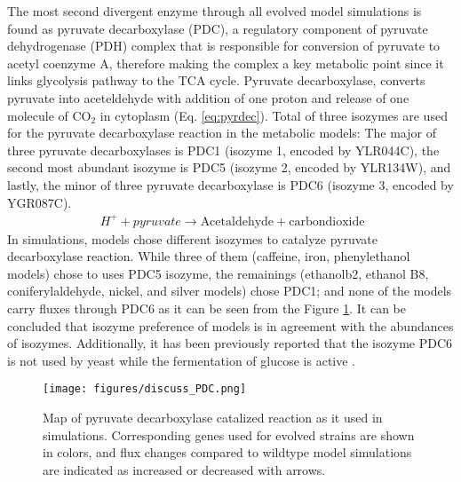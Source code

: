 The most second divergent enzyme through all evolved model simulations is found as pyruvate decarboxylase (PDC), a regulatory component of pyruvate dehydrogenase (PDH) complex that is responsible for conversion of pyruvate to acetyl coenzyme A, therefore making the complex a key metabolic point since it links glycolysis pathway to the TCA cycle. Pyruvate decarboxylase, converts pyruvate into aceteldehyde with addition of one proton and release of one molecule of CO$_2$ in cytoplasm (Eq. \ref{eq:pyrdec}). Total of three isozymes are used for the pyruvate decarboxylase reaction in the metabolic models: The major of three pyruvate decarboxylases is PDC1 (isozyme 1, encoded by YLR044C), the second most abundant isozyme is PDC5 (isozyme 2, encoded by YLR134W), and lastly, the minor of three pyruvate decarboxylase is PDC6 (isozyme 3, encoded by YGR087C).
\begin{align}
\label{eq:pyrdec}
\ H^+ + pyruvate \rightarrow \text{Acetaldehyde} + \text{carbondioxide}
\end{align}
In simulations, models chose different isozymes to catalyze pyruvate decarboxylase reaction. While three of them (caffeine,  iron,  phenylethanol models) chose to uses PDC5 isozyme, the remainings (ethanolb2, ethanol B8, coniferylaldehyde, nickel, and silver models) chose PDC1; and none of the models carry fluxes through PDC6 as it can be seen from the Figure \ref{fig:discuss_PDC}. It can be concluded that isozyme preference of models is in agreement with the abundances of isozymes. Additionally, it has been previously reported that the isozyme PDC6 is not used by yeast while the fermentation of glucose is active \cite{hohmann1991pdc6}.

\begin{figure}[H]
\texttt{[image: figures/discuss\_PDC.png]}
\caption[Map of pyruvate decarboxylase catalized reaction as it used in simulations]{Map of pyruvate decarboxylase catalized reaction as it used in simulations. Corresponding genes used for evolved strains are shown in colors, and flux changes compared to wildtype model simulations are indicated as increased or decreased with arrows.}
\label{fig:discuss_PDC}
\end{figure}

